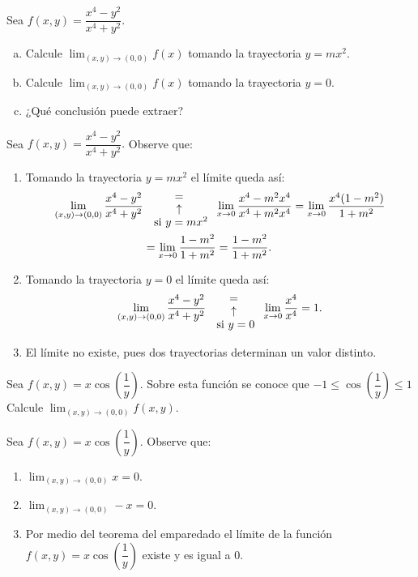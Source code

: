 \begin{prob}
Sea $f(x,y)=\dfrac{x^4-y^2}{x^4+y^2}.$
\begin{enumerate}[(a)]
    \item Calcule $\displaystyle\lim_{(x,y)\to (0,0)}f(x)$ tomando la trayectoria $y=mx^2.$
    \item Calcule $\displaystyle\lim_{(x,y)\to (0,0)}f(x)$ tomando la trayectoria $y=0.$
    \item ¿Qué conclusión puede extraer?
\end{enumerate}
\begin{myproof}
Sea $f(x,y)=\dfrac{x^4-y^2}{x^4+y^2}.$ Observe que:
\begin{enumerate}[$a)$]
\item Tomando la trayectoria $y=mx^2$ el límite queda así:
\begin{align*}
\displaystyle\lim_{(x,y)\to (0,0)} \dfrac{x^4-y^2}{x^4+y^2} &{{=}\atop {\begin{array}{c}
\uparrow\\ \text{ si $y=mx^2$}\end{array}} } \displaystyle\lim_{x\to 0}\dfrac{x^4-m^2x^4}{x^4+m^2x^4}=\displaystyle\lim_{x\to 0}\dfrac{x^4(1-m^2)}{1+m^2}\\&=\lim_{x\to 0}\dfrac{1-m^2}{1+m^2}=\dfrac{1-m^2}{1+m^2}.
\end{align*}
\item Tomando la trayectoria $y=0$ el límite queda así:
\begin{align*}
\displaystyle\lim_{(x,y)\to (0,0)} \dfrac{x^4-y^2}{x^4+y^2} {{=}\atop {\begin{array}{c}
\uparrow\\ \text{ si $y=0$}\end{array}} } \displaystyle\lim_{x\to 0}\dfrac{x^4}{x^4}=1.
\end{align*}
\item El límite no existe, pues dos trayectorias determinan un valor distinto.
\end{enumerate}
\end{myproof}
\end{prob}

\begin{prob}
Sea $f(x,y)=x\cos\left(\dfrac{1}{y}\right).$ Sobre esta función se conoce que $-1\leq \cos\left(\dfrac{1}{y}\right)\leq 1$ Calcule $\displaystyle\lim_{(x,y)\to (0,0)}f(x,y).$
\begin{myproof}
Sea $f(x,y)=x\cos\left(\dfrac{1}{y}\right).$ Observe que:
\begin{enumerate}[$a)$]
\item $\displaystyle\lim_{(x,y)\to (0,0)} x = 0.$
\item $\displaystyle\lim_{(x,y)\to (0,0)} -x = 0.$
\item Por medio del teorema del emparedado el límite de la función $f(x,y)=x\cos\left(\dfrac{1}{y}\right)$  existe y es igual a $0.$
\end{enumerate}
\end{myproof}
\end{prob}

